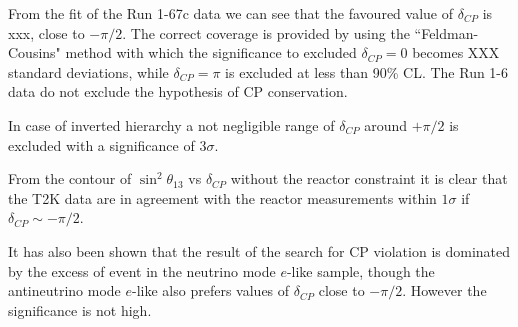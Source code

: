 From the fit of the Run 1-67c data we can see that the favoured value of $\delta_{CP}$ is xxx, close to $-\pi/2$.
The correct coverage is provided by using the ``Feldman-Cousins" method with which the 
significance to excluded $\delta_{CP}=0$ becomes XXX standard deviations,
while $\delta_{CP}=\pi$ is excluded at less than 90\% CL.
The Run 1-6 data do not exclude the hypothesis of CP conservation. 

In case of inverted hierarchy a not negligible range of $\delta_{CP}$ around $+\pi/2$ is excluded with 
a significance of $3\sigma$.

From the contour of $\sin^2 \theta_{13}$ vs $\delta_{CP}$ without the reactor constraint 
it is clear that the T2K data are in agreement with the reactor measurements within $1\sigma$ 
if $\delta_{CP} \sim -\pi/2$.

It has also been shown that the result of the search for CP violation is dominated by the excess of event in the neutrino mode
$e$-like sample, though the antineutrino mode $e$-like also prefers values of $\delta_{CP}$ close to $-\pi/2$.
However the significance is not high.



\clearpage
